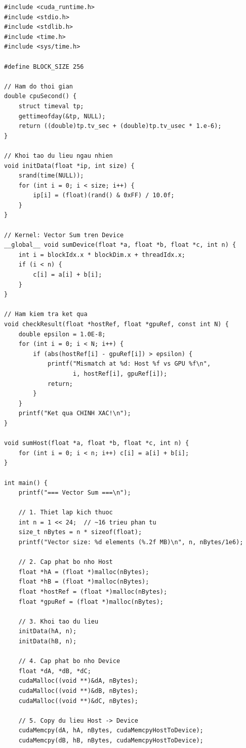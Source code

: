 \begin{lstlisting}[caption={Chương trình Vector Sum đầy đủ}, label={lst:vector_sum_full}]
#include <cuda_runtime.h>
#include <stdio.h>
#include <stdlib.h>
#include <time.h>
#include <sys/time.h>

#define BLOCK_SIZE 256

// Ham do thoi gian
double cpuSecond() {
    struct timeval tp;
    gettimeofday(&tp, NULL);
    return ((double)tp.tv_sec + (double)tp.tv_usec * 1.e-6);
}

// Khoi tao du lieu ngau nhien
void initData(float *ip, int size) {
    srand(time(NULL));
    for (int i = 0; i < size; i++) {
        ip[i] = (float)(rand() & 0xFF) / 10.0f;
    }
}

// Kernel: Vector Sum tren Device
__global__ void sumDevice(float *a, float *b, float *c, int n) {
    int i = blockIdx.x * blockDim.x + threadIdx.x;
    if (i < n) {
        c[i] = a[i] + b[i];
    }
}

// Ham kiem tra ket qua
void checkResult(float *hostRef, float *gpuRef, const int N) {
    double epsilon = 1.0E-8;
    for (int i = 0; i < N; i++) {
        if (abs(hostRef[i] - gpuRef[i]) > epsilon) {
            printf("Mismatch at %d: Host %f vs GPU %f\n", 
                   i, hostRef[i], gpuRef[i]);
            return;
        }
    }
    printf("Ket qua CHINH XAC!\n");
}

void sumHost(float *a, float *b, float *c, int n) {
    for (int i = 0; i < n; i++) c[i] = a[i] + b[i];
}

int main() {
    printf("=== Vector Sum ===\n");

    // 1. Thiet lap kich thuoc
    int n = 1 << 24;  // ~16 trieu phan tu
    size_t nBytes = n * sizeof(float);
    printf("Vector size: %d elements (%.2f MB)\n", n, nBytes/1e6);

    // 2. Cap phat bo nho Host
    float *hA = (float *)malloc(nBytes);
    float *hB = (float *)malloc(nBytes);
    float *hostRef = (float *)malloc(nBytes);
    float *gpuRef = (float *)malloc(nBytes);

    // 3. Khoi tao du lieu
    initData(hA, n);
    initData(hB, n);

    // 4. Cap phat bo nho Device
    float *dA, *dB, *dC;
    cudaMalloc((void **)&dA, nBytes);
    cudaMalloc((void **)&dB, nBytes);
    cudaMalloc((void **)&dC, nBytes);

    // 5. Copy du lieu Host -> Device
    cudaMemcpy(dA, hA, nBytes, cudaMemcpyHostToDevice);
    cudaMemcpy(dB, hB, nBytes, cudaMemcpyHostToDevice);


\end{lstlisting}
